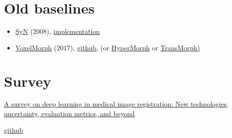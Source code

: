 \documentclass{article}
\begin{document}
\section{Old baselines}

\begin{itemize}
    \item \href{https://www.sciencedirect.com/science/article/pii/S1361841507000606}{SyN} (2008), \href{https://docs.dipy.org/stable/examples_built/registration/syn_registration_2d.html#footcite-avants2008}{implementation}

    \item  \href{https://arxiv.org/pdf/1809.05231}{VoxelMorph} (2017), \href{https://github.com/voxelmorph/voxelmorph/tree/dev}{github}, (or \href{https://arxiv.org/pdf/2101.01035}{HyperMorph} or \href{https://github.com/junyuchen245/TransMorph_Transformer_for_Medical_Image_Registration}{TransMorph)}
\end{itemize}

\section{Survey}

\href{https://www.sciencedirect.com/science/article/pii/S1361841524003104?ref=pdf_download&fr=RR-2&rr=8fdb47670bc2d390}{A survey on deep learning in medical image registration: New technologies, uncertainty, evaluation metrics, and beyond}

\href{https://github.com/JHU-MedImage-Reg/MedImgReg_Survey}{github}
\end{document}
